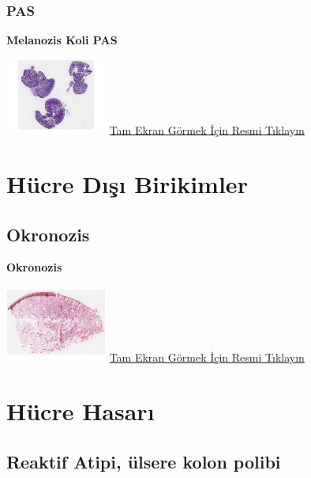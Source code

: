 \documentclass[
  letterpaper,
  DIV=11,
  numbers=noendperiod]{scrreprt}
\begin{document}
\hypertarget{pas-2}{%
\subsection{PAS}\label{pas-2}}

\textbf{Melanozis Koli PAS}

\href{https://images.patolojiatlasi.com/melanosiscoli/PAS.html}{\includegraphics[width=0.25\textwidth,height=\textheight]{./screenshots/melanosiscoli-PAS_screenshot.png}}
\href{https://images.patolojiatlasi.com/melanosiscoli/PAS.html}{Tam
Ekran Görmek İçin Resmi Tıklayın}

\hypertarget{sec-hucre-disi-birikimler}{%
\chapter{Hücre Dışı Birikimler}\label{sec-hucre-disi-birikimler}}

\hypertarget{sec-okronozis}{%
\section{Okronozis}\label{sec-okronozis}}

\textbf{Okronozis}

\href{https://images.patolojiatlasi.com/ochronosis/HE.html}{\includegraphics[width=0.25\textwidth,height=\textheight]{./screenshots/ochronosis_screenshot.png}}
\href{https://images.patolojiatlasi.com/ochronosis/HE.html}{Tam Ekran
Görmek İçin Resmi Tıklayın}

\hypertarget{sec-hucre-hasari}{%
\chapter{Hücre Hasarı}\label{sec-hucre-hasari}}

\hypertarget{sec-reaktif-atipi}{%
\section{Reaktif Atipi, ülsere kolon polibi}\label{sec-reaktif-atipi}}
\end{document}
